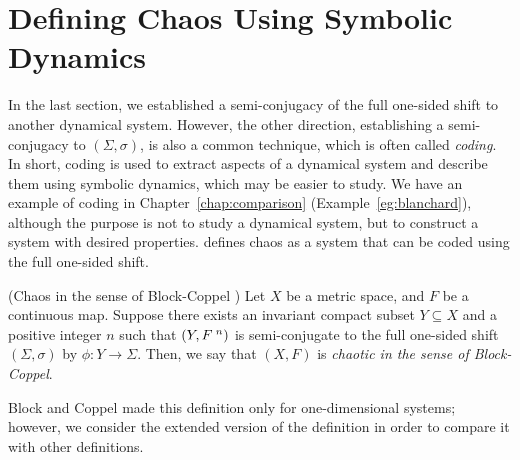 \documentclass[10pt,twoside]{book}
\begin{document}
\section{Defining Chaos Using Symbolic Dynamics}
In the last section, we established a semi-conjugacy of the full one-sided shift to another dynamical system.
However, the other direction, establishing a semi-conjugacy to $(\Sigma, \sigma)$, is also a common technique, which is often called \textit{coding}.
In short, coding is used to extract aspects of a dynamical system and describe them using symbolic dynamics, which may be easier to study.
We have an example of coding in Chapter~\ref{chap:comparison} (Example~\ref{eg:blanchard}), although the purpose is not to study a dynamical system, but to construct a system with desired properties.
\citet{blockcoppel} defines chaos as a system that can be coded using the full one-sided shift.
\begin{definition}
  (Chaos in the sense of Block-Coppel \citep{blockcoppel})
  Let $X$ be a metric space, and $F$ be a continuous map.
  Suppose there exists an invariant compact subset $Y \subseteq X$ and a positive integer $n$ such that $(Y,F^{\;n})$ is semi-conjugate to the full one-sided shift $(\Sigma, \sigma)$ by $\phi: Y \to \Sigma$.
  Then, we say that $(X,F)$ is \textit{chaotic in the sense of Block-Coppel}.
  \begin{center}
  \end{center}
  \label{defn:blockcoppel}
\end{definition}
Block and Coppel made this definition only for one-dimensional systems; however, we consider the extended version of the definition in order to compare it with other definitions.
\end{document}
